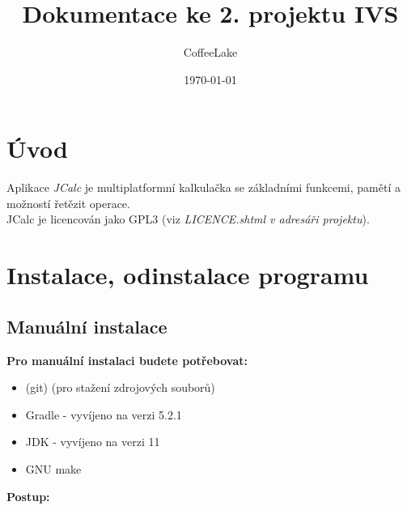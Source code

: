 \documentclass[a4paper, 11pt]{article}
\title{Dokumentace ke 2. projektu IVS}
\author{CoffeeLake}
\date{\today}
\begin{document}
	
\maketitle
\tableofcontents


\newpage

\section{Úvod}

Aplikace \emph{JCalc} je multiplatformní kalkulačka se základními funkcemi, pamětí a možností řetězit operace.\\
JCalc je licencován jako GPL3 (viz \emph{LICENCE.shtml v adresáři projektu}).


\section{Instalace, odinstalace programu}

\subsection{Manuální instalace}

\textbf{Pro manuální instalaci budete potřebovat:}

\begin{itemize}
	\item (git) (pro stažení zdrojových souborů)
	\item Gradle - vyvíjeno na verzi 5.2.1
	\item JDK - vyvíjeno na verzi 11
	\item GNU make
\end{itemize}

\noindent
\textbf{Postup:}
\end{document}
